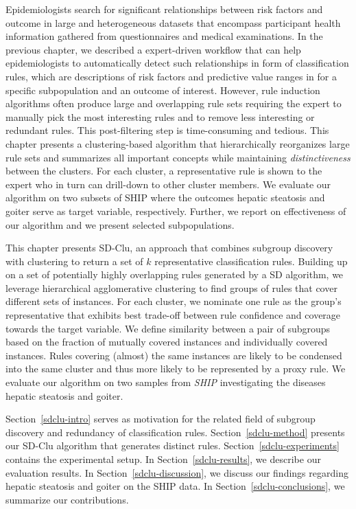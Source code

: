 \documentclass[
  oneside]{book}
\begin{document}
Epidemiologists search for significant relationships between risk factors and outcome in large and heterogeneous datasets that encompass participant health information gathered from questionnaires and medical examinations.
In the previous chapter, we described a expert-driven workflow that can help epidemiologists to automatically detect such relationships in form of classification rules, which are descriptions of risk factors and predictive value ranges in for a specific subpopulation and an outcome of interest.
However, rule induction algorithms often produce large and overlapping rule sets requiring the expert to manually pick the most interesting rules and to remove less interesting or redundant rules.
This post-filtering step is time-consuming and tedious.
This chapter presents a clustering-based algorithm that hierarchically reorganizes large rule sets and summarizes all important concepts while maintaining \emph{distinctiveness} between the clusters.
For each cluster, a representative rule is shown to the expert who in turn can drill-down to other cluster members.
We evaluate our algorithm on two subsets of SHIP where the outcomes hepatic steatosis and goiter serve as target variable, respectively.
Further, we report on effectiveness of our algorithm and we present selected subpopulations.

This chapter presents SD-Clu, an approach that combines subgroup discovery with clustering to return a set of \(k\) representative classification rules.
Building up on a set of potentially highly overlapping rules generated by a SD algorithm, we leverage hierarchical agglomerative clustering to find groups of rules that cover different sets of instances.
For each cluster, we nominate one rule as the group's representative that exhibits best trade-off between rule confidence and coverage towards the target variable.
We define similarity between a pair of subgroups based on the fraction of mutually covered instances and individually covered instances.
Rules covering (almost) the same instances are likely to be condensed into the same cluster and thus more likely to be represented by a proxy rule.
We evaluate our algorithm on two samples from \emph{SHIP} investigating the diseases hepatic steatosis and goiter.

Section~\ref{sdclu-intro} serves as motivation for the related field of subgroup discovery and redundancy of classification rules.
Section~\ref{sdclu-method} presents our SD-Clu algorithm that generates distinct rules.
Section~\ref{sdclu-experiments} contains the experimental setup.
In Section~\ref{sdclu-results}, we describe our evaluation results.
In Section~\ref{sdclu-discussion}, we discuss our findings regarding hepatic steatosis and goiter on the SHIP data.
In Section~\ref{sdclu-conclusions}, we summarize our contributions.
\end{document}
